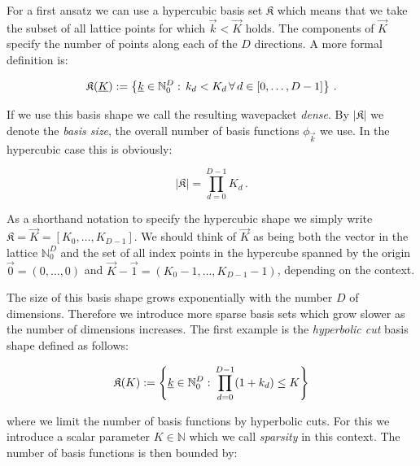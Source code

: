 For a first ansatz we can use a hypercubic basis set $\mathfrak{K}$ which means
that we take the subset of all lattice points for which $\vec{k} < \vec{K}$ holds.
The components of $\vec{K}$ specify the number of points along each of the $D$
directions. A more formal definition is:

\begin{definition}
  \begin{equation}
    \mathfrak{K}(\underline{K}) := \left\{ \underline{k} \in \mathbb{N}_0^D :
                                          \, k_d < K_d \,\forall\, d \in [0, \ldots, D-1] \right\} \,.
  \end{equation}
\end{definition}

If we use this basis shape we call the resulting wavepacket \emph{dense}. By
$|\mathfrak{K}|$ we denote the \emph{basis size}, the overall number of basis
functions $\phi_{\vec{k}}$ we use. In the hypercubic case this is obviously:

\begin{equation}
  |\mathfrak{K}| = \prod_{d=0}^{D-1} K_d \,.
\end{equation}

As a shorthand notation to specify the hypercubic shape we simply write
$\mathfrak{K} = \vec{K} = [K_0, \ldots, K_{D-1}]$. We should think of $\vec{K}$ as
being both the vector in the lattice $\mathbb{N}_0^D$ and the set of all index
points in the hypercube spanned by the origin $\vec{0} = (0, \ldots, 0)$ and
$\vec{K} - \vec{1} = (K_0-1, \ldots, K_{D-1}-1)$, depending on the context.

The size of this basis shape grows exponentially with the number $D$ of dimensions.
Therefore we introduce more sparse basis sets which grow slower as the number
of dimensions increases. The first example is the \emph{hyperbolic cut} basis shape
defined as follows:

\begin{definition} \label{def:hyperbolic_cut_shape}
  \begin{equation}
    \mathfrak{K}(K) := \left\{ \underline{k} \in \mathbb{N}_0^D :
                                    \, \prod_{d=0}^{D-1}(1+k_d) \leq K \right\}
  \end{equation}
\end{definition}

where we limit the number of basis functions by hyperbolic cuts. For this we
introduce a scalar parameter $K \in \mathbb{N}$ which we call \emph{sparsity}
in this context. The number of basis functions is then bounded by:

